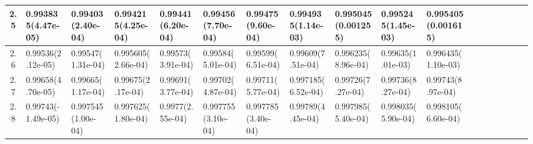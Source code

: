 \documentclass[
	article,			%
	12pt,				%
	twoside,			%
	a4paper,			%
	english,			%
	brazil,				%
	]{abntex2}
\begin{document}
\begin{landscape}
\begin{table}
\begin{tabular}{c||p{18mm}|p{18mm}|p{18mm}|p{18mm}|p{18mm}|p{18mm}|p{18mm}|p{18mm}|p{18mm}|p{18mm}|p{18mm}|p{18mm}|p{18mm}|p{18mm}|p{18mm}|p{18mm}|p{18mm}}
    			2.5 &0.993835\newline(4.47e-05)&0.99403\newline(2.40e-04)&0.994215\newline(4.25e-04)&0.99441\newline(6.20e-04)&0.99456\newline(7.70e-04)&0.99475\newline(9.60e-04)&0.994935\newline(1.14e-03)&0.995045\newline(0.001255)&0.995245\newline(1.45e-03)&0.995405\newline(0.001615)\\\hline
    			2.6 & 0.99536\newline(2.12e-05)&0.99547\newline(1.31e-04)&0.995605\newline(2.66e-04)&0.99573\newline(3.91e-04)&0.99584\newline(5.01e-04)&0.99599\newline(6.51e-04)&0.99609\newline(7.51e-04)&0.996235\newline(8.96e-04)&0.99635\newline(1.01e-03)&0.996435\newline(1.10e-03)\\\hline
    			2.7 &0.99658\newline(4.70e-05)&0.99665\newline(1.17e-04)&0.99675\newline(2.17e-04)&0.99691\newline(3.77e-04)&0.99702\newline(4.87e-04)&0.99711\newline(5.77e-04)&0.997185\newline(6.52e-04)&0.99726\newline(7.27e-04)&0.99736\newline(8.27e-04)&0.99743\newline(8.97e-04)\\\hline
    			2.8 &0.99743\newline(-1.49e-05)&0.997545\newline(1.00e-04)&0.997625\newline(1.80e-04)&0.9977\newline(2.55e-04)&0.997755\newline(3.10e-04)&0.997785\newline(3.40e-04)&0.99789\newline(4.45e-04)&0.997985\newline(5.40e-04)&0.998035\newline(5.90e-04)&0.998105\newline(6.60e-04)\\\hline

\end{tabular}
\end{table}
\end{landscape}
\end{document}
